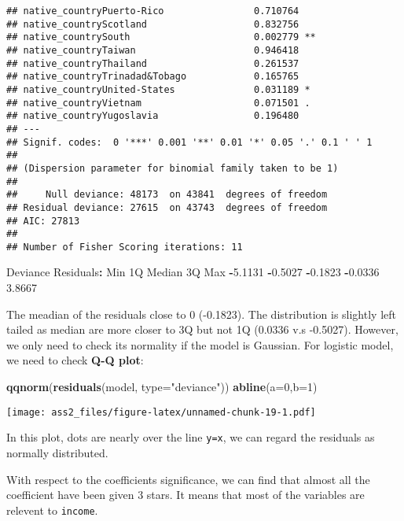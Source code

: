 \documentclass[]{article}
\newenvironment{Shaded}{\begin{snugshade}}{\end{snugshade}}
\newcommand{\KeywordTok}[1]{\textcolor[rgb]{0.13,0.29,0.53}{\textbf{#1}}}
\newcommand{\DataTypeTok}[1]{\textcolor[rgb]{0.13,0.29,0.53}{#1}}
\newcommand{\DecValTok}[1]{\textcolor[rgb]{0.00,0.00,0.81}{#1}}
\newcommand{\FloatTok}[1]{\textcolor[rgb]{0.00,0.00,0.81}{#1}}
\newcommand{\StringTok}[1]{\textcolor[rgb]{0.31,0.60,0.02}{#1}}
\newcommand{\OperatorTok}[1]{\textcolor[rgb]{0.81,0.36,0.00}{\textbf{#1}}}
\newcommand{\NormalTok}[1]{#1}
\begin{document}
\begin{verbatim}
## native_countryPuerto-Rico                0.710764    
## native_countryScotland                   0.832756    
## native_countrySouth                      0.002779 ** 
## native_countryTaiwan                     0.946418    
## native_countryThailand                   0.261537    
## native_countryTrinadad&Tobago            0.165765    
## native_countryUnited-States              0.031189 *  
## native_countryVietnam                    0.071501 .  
## native_countryYugoslavia                 0.196480    
## ---
## Signif. codes:  0 '***' 0.001 '**' 0.01 '*' 0.05 '.' 0.1 ' ' 1
## 
## (Dispersion parameter for binomial family taken to be 1)
## 
##     Null deviance: 48173  on 43841  degrees of freedom
## Residual deviance: 27615  on 43743  degrees of freedom
## AIC: 27813
## 
## Number of Fisher Scoring iterations: 11
\end{verbatim}

\begin{Shaded}
\begin{Highlighting}[]
\NormalTok{Deviance Residuals}\OperatorTok{:}\StringTok{ }
\StringTok{    }\NormalTok{Min       1Q   Median       3Q      Max  }
\OperatorTok{-}\FloatTok{5.1131}  \OperatorTok{-}\FloatTok{0.5027}  \OperatorTok{-}\FloatTok{0.1823}  \OperatorTok{-}\FloatTok{0.0336}   \FloatTok{3.8667}  
\end{Highlighting}
\end{Shaded}

The meadian of the residuals close to 0 (-0.1823). The distribution is
slightly left tailed as median are more closer to 3Q but not 1Q (0.0336
v.s -0.5027). However, we only need to check its normality if the model
is Gaussian. For logistic model, we need to check \textbf{Q-Q plot}:

\begin{Shaded}
\begin{Highlighting}[]
\KeywordTok{qqnorm}\NormalTok{(}\KeywordTok{residuals}\NormalTok{(model, }\DataTypeTok{type=}\StringTok{"deviance"}\NormalTok{))}
\KeywordTok{abline}\NormalTok{(}\DataTypeTok{a=}\DecValTok{0}\NormalTok{,}\DataTypeTok{b=}\DecValTok{1}\NormalTok{)}
\end{Highlighting}
\end{Shaded}

\texttt{[image: ass2\_files/figure-latex/unnamed-chunk-19-1.pdf]}

In this plot, dots are nearly over the line \texttt{y=x}, we can regard
the residuals as normally distributed.

With respect to the coefficients significance, we can find that almost
all the coefficient have been given 3 stars. It means that most of the
variables are relevent to \texttt{income}.
\end{document}
